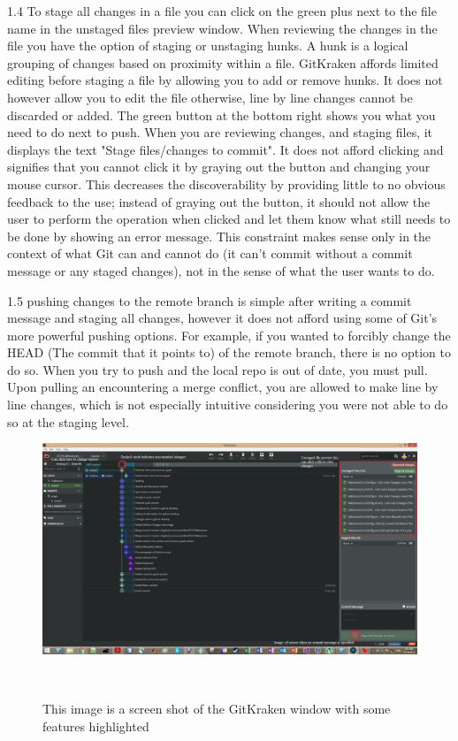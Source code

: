 \documentclass{sigchi}
\begin{document}
1.4 To stage all changes in a file you can click on the green plus next to the file name in the unstaged files preview window. When reviewing the changes in the file you have the option of staging or unstaging hunks. A hunk is a logical grouping of changes based on proximity within a file. GitKraken affords limited editing before staging a file by allowing you to add or remove hunks. It does not however allow you to edit the file otherwise, line by line changes cannot be discarded or added.
The green button at the bottom right shows you what you need to do next to push. When you are reviewing changes, and staging files, it displays the text "Stage files/changes to commit". It does not afford clicking and signifies that you cannot click it by graying out the button and changing your mouse cursor. This decreases the discoverability by providing little to no obvious feedback to the use; instead of graying out the button, it should not allow the user to perform the operation when clicked and let them know what still needs to be done by showing an error message. This constraint makes sense only in the context of what Git can and cannot do (it can't commit without a commit message or any staged changes), not in the sense of what the user wants to do.

1.5 pushing changes to the remote branch is simple after writing a commit message and staging all changes, however it does not afford using some of Git's more powerful pushing options. For example, if you wanted to forcibly change the HEAD (The commit that it points to) of the remote branch, there is no option to do so. When you try to push and the local repo is out of date, you must pull. Upon pulling an encountering a merge conflict, you are allowed to make line by line changes, which is not especially intuitive considering you were not able to do so at the staging level.

\begin{figure}
  \centering
  \includegraphics[width=1.75\columnwidth]{figures/GitKraken/ScreenshotHighlighted}
  \caption{This image is a screen shot of the GitKraken window with some features highlighted}~\label{fig:GitKrakenFigure2}
\end{figure}
\end{document}
